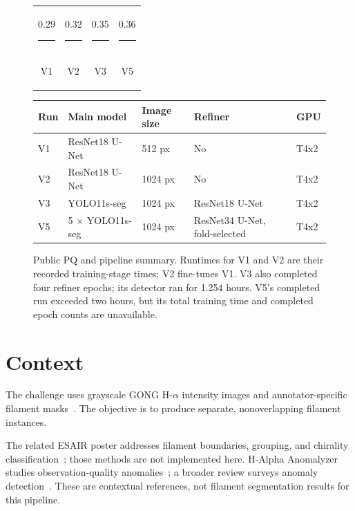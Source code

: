 \documentclass[sigconf]{acmart}
\begin{document}
\begin{figure}[t]
\centering
\large
\begin{tabular}{cccc}
\shortstack{0.29\\\textcolor{blue!65!black}{\rule{1.1cm}{14.5mm}}\\V1} &
\shortstack{0.32\\\textcolor{orange!85!black}{\rule{1.1cm}{16mm}}\\V2} &
\shortstack{0.35\\\textcolor{green!50!black}{\rule{1.1cm}{17.5mm}}\\V3} &
\shortstack{0.36\\\textcolor{purple!70!black}{\rule{1.1cm}{18mm}}\\V5}
\end{tabular}

\smallskip
\normalsize
\begin{tabular}{lllll}
\hline
Run & Main model & Image size & Refiner & GPU \\
\hline
V1 & ResNet18 U-Net & 512 px & No & T4x2 \\
V2 & ResNet18 U-Net & 1024 px & No & T4x2 \\
V3 & YOLO11s-seg & 1024 px & ResNet18 U-Net & T4x2 \\
V5 & 5 $\times$ YOLO11s-seg & 1024 px & ResNet34 U-Net, fold-selected & T4x2 \\
\hline
\end{tabular}
\caption{Public PQ and pipeline summary. Runtimes for V1 and V2 are their
recorded training-stage times; V2 fine-tunes V1. V3 also completed four
refiner epochs; its detector ran for 1.254 hours. V5's completed run exceeded
two hours, but its total training time and completed epoch counts are
unavailable.}
\label{fig:scores}
\end{figure}

\section{Context}
The challenge uses grayscale GONG H-$\alpha$ intensity images and
annotator-specific filament masks~\cite{filament-segmentation-2026,ahmadzadeh2024dataset}.
The objective is to produce separate, nonoverlapping filament instances.


The related ESAIR poster addresses filament boundaries, grouping, and
chirality classification~\cite{esairposter2026}; those methods are not
implemented here. H-Alpha Anomalyzer studies observation-quality
anomalies~\cite{khazaei2025software,khazaei2025icdm}; a broader review
surveys anomaly detection~\cite{ruff2021anomaly}. These are contextual
references, not filament segmentation results for this pipeline.
\end{document}
